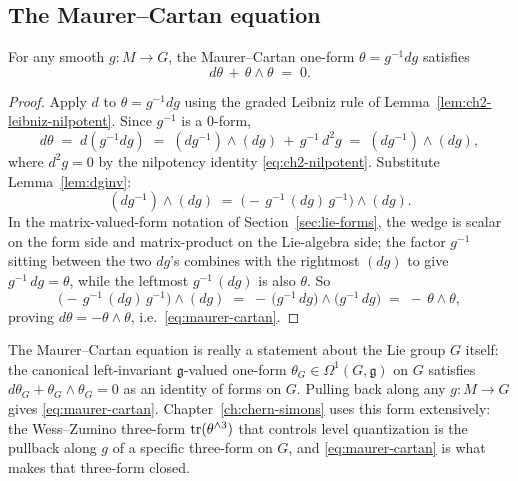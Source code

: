 \subsection{The Maurer--Cartan equation}

\begin{lemma}\label{lem:maurer-cartan}
For any smooth $g : M \to G$, the Maurer--Cartan one-form $\theta = g^{-1} dg$ satisfies
\begin{equation}\label{eq:maurer-cartan}
d\theta \,+\, \theta \wedge \theta \;=\; 0.
\end{equation}
\end{lemma}

\begin{proof}
Apply $d$ to $\theta = g^{-1} dg$ using the graded Leibniz rule of Lemma~\ref{lem:ch2-leibniz-nilpotent}. Since $g^{-1}$ is a 0-form,
\begin{equation*}
d\theta \;=\; d(g^{-1} dg) \;=\; (dg^{-1}) \wedge (dg) \,+\, g^{-1}\, d^2 g \;=\; (dg^{-1}) \wedge (dg),
\end{equation*}
where $d^2 g = 0$ by the nilpotency identity \eqref{eq:ch2-nilpotent}. Substitute Lemma~\ref{lem:dginv}:
\begin{equation*}
(dg^{-1}) \wedge (dg) \;=\; \bigl(-\, g^{-1}\, (dg)\, g^{-1}\bigr) \wedge (dg).
\end{equation*}
In the matrix-valued-form notation of Section~\ref{sec:lie-forms}, the wedge is scalar on the form side and matrix-product on the Lie-algebra side; the factor $g^{-1}$ sitting between the two $dg$'s combines with the rightmost $(dg)$ to give $g^{-1}\, dg = \theta$, while the leftmost $g^{-1}\,(dg)$ is also $\theta$. So
\begin{equation*}
\bigl(-\, g^{-1}\, (dg)\, g^{-1}\bigr) \wedge (dg) \;=\; -\, \bigl(g^{-1}\, dg\bigr) \wedge \bigl(g^{-1}\, dg\bigr) \;=\; -\, \theta \wedge \theta,
\end{equation*}
proving $d\theta = -\theta \wedge \theta$, i.e.\ \eqref{eq:maurer-cartan}.
\end{proof}

\begin{remark}\label{rem:mc-on-group}
The Maurer--Cartan equation is really a statement about the Lie group $G$ itself: the canonical left-invariant $\mathfrak{g}$-valued one-form $\theta_G \in \Omega^1(G, \mathfrak{g})$ on $G$ satisfies $d\theta_G + \theta_G \wedge \theta_G = 0$ as an identity of forms on $G$. Pulling back along any $g : M \to G$ gives \eqref{eq:maurer-cartan}. Chapter~\ref{ch:chern-simons} uses this form extensively: the Wess--Zumino three-form $\operatorname{tr}(\theta^{\wedge 3})$ that controls level quantization is the pullback along $g$ of a specific three-form on $G$, and \eqref{eq:maurer-cartan} is what makes that three-form closed.
\end{remark}


